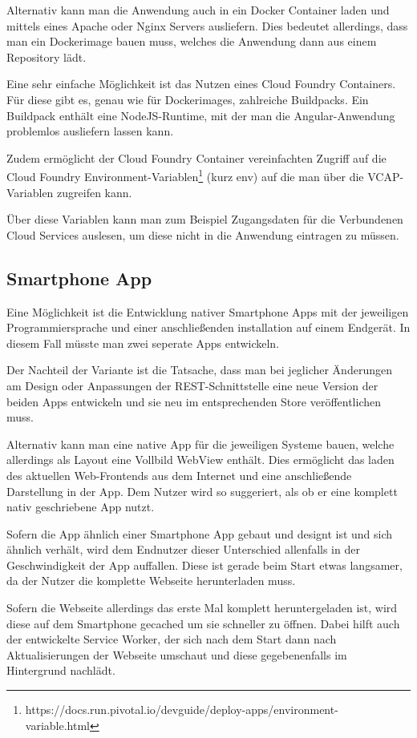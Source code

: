 Alternativ kann man die Anwendung auch in ein Docker Container laden und mittels eines Apache oder Nginx Servers
ausliefern. Dies bedeutet allerdings, dass man ein Dockerimage bauen muss, welches die Anwendung dann aus einem
Repository lädt.

Eine sehr einfache Möglichkeit ist das Nutzen eines Cloud Foundry Containers. Für diese gibt es, genau wie für
Dockerimages, zahlreiche Buildpacks. Ein Buildpack enthält eine NodeJS-Runtime, mit der man die Angular-Anwendung
problemlos ausliefern lassen kann.

Zudem ermöglicht der Cloud Foundry Container vereinfachten Zugriff auf die Cloud Foundry
Environment-Variablen\footnote{https://docs.run.pivotal.io/devguide/deploy-apps/environment-variable.html} (kurz env)
auf die man über die VCAP-Variablen zugreifen kann.

Über diese Variablen kann man zum Beispiel Zugangsdaten für die Verbundenen Cloud Services auslesen, um diese nicht in
die Anwendung eintragen zu müssen.

\subsection{Smartphone App}
Eine Möglichkeit ist die Entwicklung nativer Smartphone Apps mit der jeweiligen Programmiersprache und einer
anschließenden installation auf einem Endgerät. In diesem Fall müsste man zwei seperate Apps entwickeln.

Der Nachteil der Variante ist die Tatsache, dass man bei jeglicher Änderungen am Design oder Anpassungen der
REST-Schnittstelle eine neue Version der beiden Apps entwickeln und sie neu im entsprechenden Store veröffentlichen
muss.

Alternativ kann man eine native App für die jeweiligen Systeme bauen, welche allerdings als Layout eine Vollbild WebView
enthält. Dies ermöglicht das laden des aktuellen Web-Frontends aus dem Internet und eine anschließende Darstellung in
der App. Dem Nutzer wird so suggeriert, als ob er eine komplett nativ geschriebene App nutzt.

Sofern die App ähnlich einer Smartphone App gebaut und designt ist und sich ähnlich verhält, wird dem Endnutzer dieser
Unterschied allenfalls in der Geschwindigkeit der App auffallen. Diese ist gerade beim Start etwas langsamer, da der
Nutzer die komplette Webseite herunterladen muss.

Sofern die Webseite allerdings das erste Mal komplett heruntergeladen ist, wird diese auf dem Smartphone gecached um sie
schneller zu öffnen. Dabei hilft auch der entwickelte Service Worker, der sich nach dem Start dann nach Aktualisierungen
der Webseite umschaut und diese gegebenenfalls im Hintergrund nachlädt.

